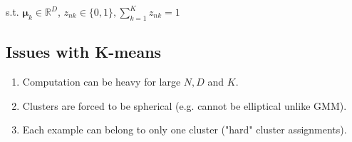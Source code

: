 s.t. $\boldsymbol{\mu}_{k} \in \mathbb{R}^{D}$,
$
z_{n k} \in\{0,1\}, \sum_{k=1}^{K} z_{n k}=1
$

\subsection*{Issues with K-means}
\begin{enumerate}
  \item Computation can be heavy for large $N, D$ and $K$.

  \item Clusters are forced to be spherical (e.g. cannot be elliptical unlike GMM).

  \item Each example can belong to only one cluster ("hard" cluster assignments).

\end{enumerate}
